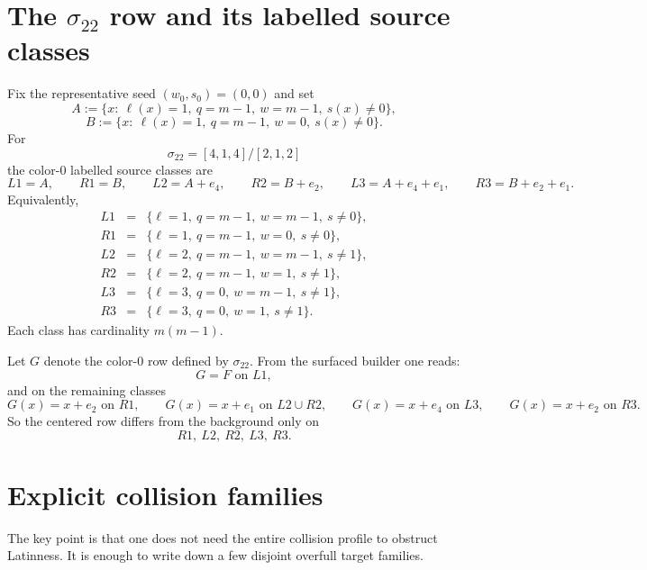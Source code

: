 \documentclass[11pt]{article}
\newcommand{\eQ}{e_1}
\newcommand{\eW}{e_2}
\newcommand{\eU}{e_4}
\begin{document}
\section*{The $\sigma_{22}$ row and its labelled source classes}

Fix the representative seed $(w_0,s_0)=(0,0)$ and set
\[
A:=\{x:\ \ell(x)=1,\ q=m-1,\ w=m-1,\ s(x)\neq 0\},
\]
\[
B:=\{x:\ \ell(x)=1,\ q=m-1,\ w=0,\ s(x)\neq 0\}.
\]
For
\[
\sigma_{22}=[4,1,4]/[2,1,2]
\]
the color-$0$ labelled source classes are
\[
L1=A,
\qquad
R1=B,
\qquad
L2=A+\eU,
\qquad
R2=B+\eW,
\qquad
L3=A+\eU+\eQ,
\qquad
R3=B+\eW+\eQ.
\]
Equivalently,
\[
\begin{array}{rcl}
L1&=&\{\ell=1,\ q=m-1,\ w=m-1,\ s\neq 0\},\\
R1&=&\{\ell=1,\ q=m-1,\ w=0,\ s\neq 0\},\\
L2&=&\{\ell=2,\ q=m-1,\ w=m-1,\ s\neq 1\},\\
R2&=&\{\ell=2,\ q=m-1,\ w=1,\ s\neq 1\},\\
L3&=&\{\ell=3,\ q=0,\ w=m-1,\ s\neq 1\},\\
R3&=&\{\ell=3,\ q=0,\ w=1,\ s\neq 1\}.
\end{array}
\]
Each class has cardinality $m(m-1)$.

Let $G$ denote the color-$0$ row defined by $\sigma_{22}$.
From the surfaced builder one reads:
\[
G=F\text{ on }L1,
\]
and on the remaining classes
\[
G(x)=x+\eW\text{ on }R1,
\qquad
G(x)=x+\eQ\text{ on }L2\cup R2,
\qquad
G(x)=x+\eU\text{ on }L3,
\qquad
G(x)=x+\eW\text{ on }R3.
\]
So the centered row differs from the background only on
\[
R1,\ L2,\ R2,\ L3,\ R3.
\]

\section*{Explicit collision families}

The key point is that one does not need the entire collision profile to obstruct
Latinness.  It is enough to write down a few disjoint overfull target families.
\end{document}
